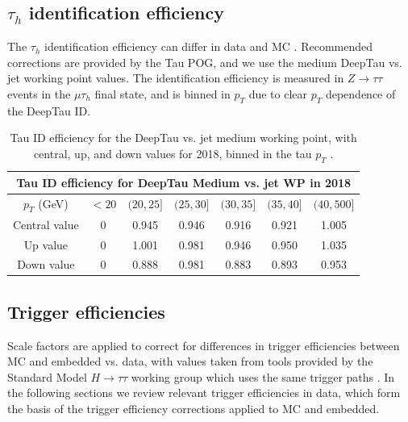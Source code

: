 \subsection{\texorpdfstring{$\tau_{h}$}{tauh} identification efficiency}
\label{sec:tauh_id_efficiency}

The $\tau_{h}$ identification efficiency can differ in data and MC \cite{twiki_TAU_POG_tauidrecommendationforrun2}. Recommended corrections are provided by the Tau POG, and we use the medium DeepTau vs. jet working point values. The identification efficiency is measured in $Z \rightarrow \tau\tau$ events in the $\mu\tau_{h}$ final state, and is binned in $p_{T}$ due to clear $p_{T}$ dependence of the DeepTau ID. 


\begin{table}[h]
    \centering
    \begin{tabular}{|c|c|c|c|c|c|c|}
    \hline
    \multicolumn{7}{|c|}{Tau ID efficiency for DeepTau Medium vs. jet WP in 2018}                                   \\ \hline
    \hline
    $p_{T}$ (GeV)  & $<20$  & $(20, 25]$ & $(25, 30]$ & $(30, 35]$ & $(35, 40]$ & $(40, 500] $   \\ \hline
    Central value  & 0      & 0.945      & 0.946      & 0.916      & 0.921      & 1.005 \\
    Up value       & 0      & 1.001      & 0.981      & 0.946      & 0.950      & 1.035 \\
    Down value     & 0      & 0.888      & 0.981      & 0.883      & 0.893      & 0.953 \\ \hline
    \end{tabular}
    \caption[Tau ID efficiency for the DeepTau vs. jet medium working point, with central, up, and down values for 2018, binned in the tau $p_{T}$.]{Tau ID efficiency for the DeepTau vs. jet medium working point, with central, up, and down values for 2018, binned in the tau $p_{T}$ \cite{twiki_TAU_POG_tauidrecommendationforrun2}.}
    \label{table:tauIDeff_deepTau_vs_jet_medium_WP}
\end{table}


\subsection{Trigger efficiencies}

Scale factors are applied to correct for differences in trigger efficiencies between MC and embedded vs. data, with values taken from tools provided by the Standard Model $H \rightarrow \tau\tau$ working group which uses the same trigger paths \cite{twiki_HiggsToTauTauWorkingLegacyRun2}. In the following sections we review relevant trigger efficiencies in data, which form the basis of the trigger efficiency corrections applied to MC and embedded.

